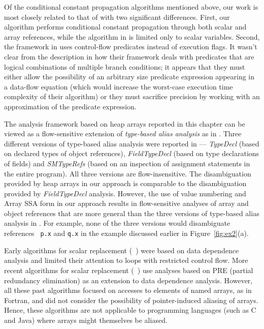 Of the conditional constant propagation algorithms mentioned above,
our work is most closely related to that of \cite{ClCo95} with two 
significant differences.
First, our algorithm performs conditional constant propagation through
both scalar and array references, while the algorithm in \cite{ClCo95}
is limited only to scalar variables.
Second,  the framework in \cite{ClCo95}
uses control-flow predicates instead of execution flags.
It wasn't clear from the description in \cite{ClCo95} how their framework
deals with predicates that are logical combinations of multiple branch
conditions; it appears that
they must either allow the possibility of
an arbitrary size predicate expression
appearing in a data-flow equation (which would increase the worst-case
execution time complexity of their algorithm) or they must sacrifice
precision by working with an approximation of the predicate expression.


The analysis framework based on heap arrays reported in this chapter 
can be viewed as a flow-sensitive extension of
{\it type-based alias analysis} as in \cite{DiwanMM1998}.
Three different versions of type-based alias analysis were reported in
\cite{DiwanMM1998} --- {\it TypeDecl} (based on declared types of object
references), {\it FieldTypeDecl} (based on type declarations of
fields) and {\it SMTypeRefs} (based on an inspection of assignment
statements in the entire program).  All three versions are
flow-insensitive.  The disambiguation provided by heap arrays in our
approach is comparable to the disambiguation provided by {\it
FieldTypeDecl} analysis.  However, the use of value numbering and
Array SSA form in our approach results in flow-sensitive analyses of
array and object references that are more general than the three
versions of type-based alias analysis in \cite{DiwanMM1998}.  For
example, none of the three versions would disambiguate references {\tt
p.x} and {\tt q.x} in the example discussed earlier in
Figure~\ref{fig:ex2}(a).

Early algorithms for scalar replacement (\eg\
\cite{CaCK90}) were based on data dependence analysis and limited
their attention to loops with restricted control flow.
More recent algorithms for scalar replacement (\eg\
\cite{CaKe94,BoGu95}) use analyses based on PRE (partial redundancy
elimination) as an extension to data dependence analysis.  However,
all these past algorithms focused on accesses to elements of named
arrays, as in Fortran, and did not consider the possibility of
pointer-induced aliasing of arrays.  Hence, these algorithms are not
applicable to programming languages (such as C and Java) where arrays
might themselves be aliased.

